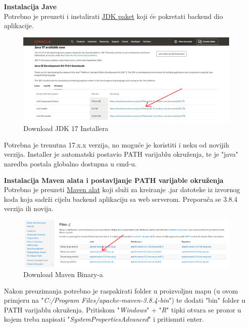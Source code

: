 			\textbf{Instalacija Jave}\\
			Potrebno je preuzeti i instalirati \href{https://www.oracle.com/java/technologies/downloads/#jdk17-windows}{JDK paket} koji će pokretati backend dio aplikacije.
			
			\begin{figure}[H]
			\centering
			\includegraphics[width=\textwidth, scale=0.5]{slike/JDKdownload}
			\caption{Download JDK 17 Installera}
			\label{fig:JDKdownload}
			\end{figure}

			Potrebna je trenutna 17.x.x verzija, no moguće je koristiti i neku od novijih verzija. Installer je automatski postavio PATH varijablu okruženja, te je "java" naredba postala globalno dostupna u cmd-u.
			
			\textbf{Instalacija Maven alata i postavljanje PATH varijable okruženja}\\
			Potrebno je preuzeti \href{https://maven.apache.org/download.cgi}{Maven alat} koji služi za kreiranje .jar datoteke iz izvornog koda koja sadrži cijelu backend aplikaciju sa web serverom. Preporuča se 3.8.4 verzija ili novija.
			
			\begin{figure}[H]
			\centering
			\includegraphics[width=\textwidth, scale=0.5]{slike/mavenDownload}
			\caption{Download Maven Binary-a}
			\label{fig:mavenDownload}
			\end{figure}
			
			Nakon preuzimanja potrebno je raspakirati folder u proizvoljnu mapu (u ovom primjeru na "\textit{C:/Program Files/apache-maven-3.8.4-bin}") te dodati "bin" folder u PATH varijablu okruženja. Pritiskom "\textit{Windows}" + "\textit{R}" tipki otvara se prozor u kojem treba napisati "\textit{SystemPropertiesAdvanced}" i pritisnuti enter.
			

